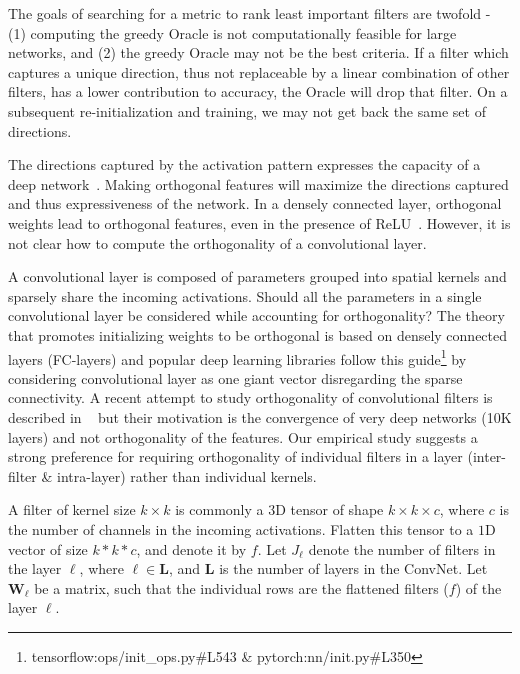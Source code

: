The goals of searching for a metric to rank least important filters are twofold - (1) computing the greedy Oracle is not computationally feasible for large networks, and (2) the greedy Oracle may not be the best criteria. If a filter which captures a unique direction, thus not replaceable by a linear combination of other filters, has a lower contribution to accuracy, the Oracle will drop that filter. On a subsequent re-initialization and training, we may not get back the same set of directions.

The directions captured by the activation pattern expresses the capacity of a deep network~\cite{Raghu2017OnTE}. 
Making orthogonal features will maximize the directions captured and thus expressiveness of the network.
In a densely connected layer, orthogonal weights lead to orthogonal features, even in the presence of ReLU~\cite{Vorontsov2017OnOA}.
However, it is not clear how to compute the orthogonality of a convolutional layer. 

A convolutional layer is composed of parameters grouped into spatial kernels and sparsely share the incoming activations.
Should all the parameters in a single convolutional layer be considered while accounting for orthogonality?
The theory that promotes initializing weights to be orthogonal is based on densely connected layers (FC-layers) and popular deep learning libraries follow this guide\footnote{tensorflow:ops/init\_ops.py\#L543 \& pytorch:nn/init.py\#L350} by considering convolutional layer as one giant vector disregarding the sparse connectivity.
A recent attempt to study orthogonality of convolutional filters is described in ~\cite{Xiao2018DynamicalIA} but their motivation is the convergence of very deep networks (10K layers) and not orthogonality of the features.
Our empirical study suggests a strong preference for requiring orthogonality of individual filters in a layer (inter-filter \& intra-layer) rather than individual kernels.


A filter of kernel size $k\times k$ is commonly a $3$D tensor of shape $k \times k \times c$, where $c$ is the number of channels in the incoming activations.
Flatten this tensor to a $1$D vector of size $k*k*c$, and denote it by $f$.
Let $J_\ell$ denote the number of filters in the layer $\ell$, where $\ell \in \mathbf{L}$, and $\mathbf{L}$ is the number of layers in the ConvNet.
Let $\boldsymbol{W}_\ell$ be a matrix, such that the individual rows are the flattened filters ($f$) of the layer $\ell$.

